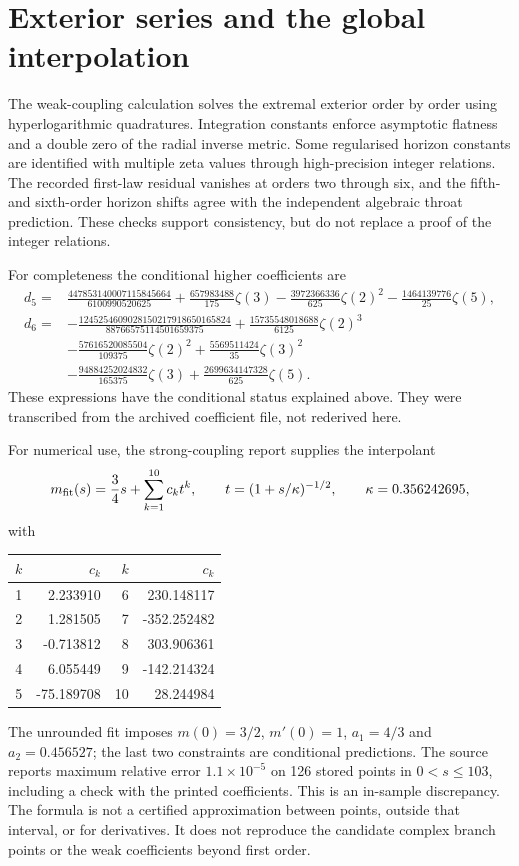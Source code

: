 \documentclass[11pt,a4paper]{article}
\newcommand{\z}{\zeta}
\begin{document}
\section{Exterior series and the global interpolation}
\label{app:series}
The weak-coupling calculation solves the extremal exterior order by order using hyperlogarithmic quadratures. Integration constants enforce asymptotic flatness and a double zero of the radial inverse metric. Some regularised horizon constants are identified with multiple zeta values through high-precision integer relations. The recorded first-law residual vanishes at orders two through six, and the fifth- and sixth-order horizon shifts agree with the independent algebraic throat prediction. These checks support consistency, but do not replace a proof of the integer relations.

For completeness the conditional higher coefficients are
\begin{align}
 d_5={}&\frac{447853140007115845664}{6100990520625}
 +\frac{657983488}{175}\z(3)-\frac{3972366336}{625}\z(2)^2
 -\frac{1464139776}{25}\z(5),\\
 d_6={}&-\frac{1245254609028150217918650165824}{88766575114501659375}
 +\frac{15735548018688}{6125}\z(2)^3\nonumber\\
 &-\frac{57616520085504}{109375}\z(2)^2
 +\frac{5569511424}{35}\z(3)^2\nonumber\\
 &
 -\frac{94884252024832}{165375}\z(3)
 +\frac{2699634147328}{625}\z(5).
\end{align}
These expressions have the conditional status explained above. They were transcribed from the archived coefficient file, not rederived here.

For numerical use, the strong-coupling report supplies the interpolant
\begin{equation}
 m_{\rm fit}(s)=\frac34s+\sum_{k=1}^{10}c_k t^k,\qquad
 t=(1+s/\kappa)^{-1/2},\qquad \kappa=0.356242695,
\end{equation}
with
\begin{center}\small
\begin{tabular}{@{}rr|rr@{}}\toprule
$k$ & $c_k$ & $k$ & $c_k$\\\midrule
1 & 2.233910 & 6 & 230.148117\\
2 & 1.281505 & 7 & -352.252482\\
3 & -0.713812 & 8 & 303.906361\\
4 & 6.055449 & 9 & -142.214324\\
5 & -75.189708 & 10 & 28.244984\\\bottomrule
\end{tabular}
\end{center}
The unrounded fit imposes $m(0)=3/2$, $m'(0)=1$, $a_1=4/3$ and $a_2=0.456527$; the last two constraints are conditional predictions. The source reports maximum relative error $1.1\times10^{-5}$ on 126 stored points in $0<s\le103$, including a check with the printed coefficients. This is an in-sample discrepancy. The formula is not a certified approximation between points, outside that interval, or for derivatives. It does not reproduce the candidate complex branch points or the weak coefficients beyond first order.
\end{document}
